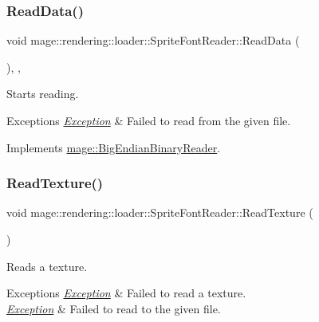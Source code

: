 \subsubsection{\texorpdfstring{Read\+Data()}{ReadData()}}
{\footnotesize\ttfamily void mage\+::rendering\+::loader\+::\+Sprite\+Font\+Reader\+::\+Read\+Data (\begin{DoxyParamCaption}{ }\end{DoxyParamCaption})\hspace{0.3cm}{\ttfamily [override]}, {\ttfamily [private]}, {\ttfamily [virtual]}}

Starts reading.


\begin{DoxyExceptions}{Exceptions}
{\em \hyperlink{classmage_1_1_exception}{Exception}} & Failed to read from the given file. \\
\hline
\end{DoxyExceptions}


Implements \hyperlink{classmage_1_1_big_endian_binary_reader_a7dc0689d598fa91308597b129516a11d}{mage\+::\+Big\+Endian\+Binary\+Reader}.

\hypertarget{classmage_1_1rendering_1_1loader_1_1_sprite_font_reader_af43be711f30780c23c9bec7d2ed48feb}{}\label{classmage_1_1rendering_1_1loader_1_1_sprite_font_reader_af43be711f30780c23c9bec7d2ed48feb} 
\subsubsection{\texorpdfstring{Read\+Texture()}{ReadTexture()}}
{\footnotesize\ttfamily void mage\+::rendering\+::loader\+::\+Sprite\+Font\+Reader\+::\+Read\+Texture (\begin{DoxyParamCaption}{ }\end{DoxyParamCaption})\hspace{0.3cm}{\ttfamily [private]}}

Reads a texture.


\begin{DoxyExceptions}{Exceptions}
{\em \hyperlink{classmage_1_1_exception}{Exception}} & Failed to read a texture. \\
\hline
{\em \hyperlink{classmage_1_1_exception}{Exception}} & Failed to read to the given file. \\
\hline
\end{DoxyExceptions}


